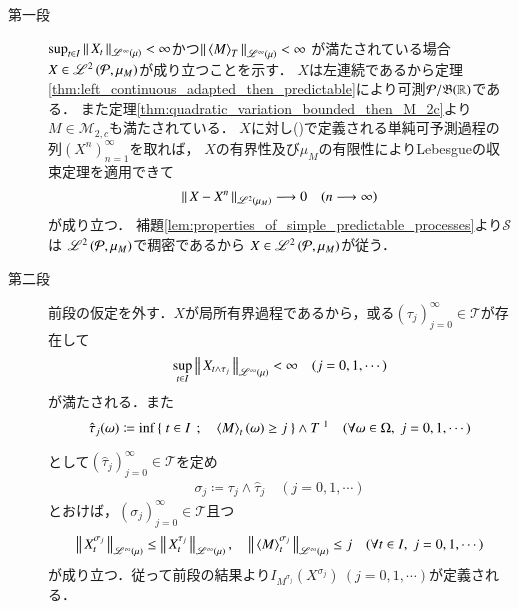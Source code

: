 	\begin{prf}\mbox{}
		\begin{description}
			\item[第一段] $\operatorname*{sup}_{t \in I} \left\|\, X_t\, \right\|_{\mathscr{L}^{\infty} \left(\mu\right)} < \infty$かつ$\Norm{\inprod<M>_T}{\semiLp{\infty}{\mu}} < \infty$
				が満たされている場合$X \in \mathscr{L}^{2} \left(\mathcal{P},\mu_M\right)$が成り立つことを示す．%
				$X$は左連続であるから定理\ref{thm:left_continuous_adapted_then_predictable}により可測$\mathcal{P}/\mathfrak{B}(\mathbb{R})$である．
				また定理\ref{thm:quadratic_variation_bounded_then_M_2c}より$M \in \mathcal{M}_{2,c}$も満たされている．
				$X$に対し()で定義される単純可予測過程の列$(X^n)_{n=1}^{\infty}$を取れば，
				$X$の有界性及び$\mu_M$の有限性によりLebesgueの収束定理を適用できて
				\begin{align}
					\left\|\, X - X^n\, \right\|_{\mathscr{L}^{2} \left(\mu_M\right)} \longrightarrow 0 
					\quad (n \longrightarrow \infty)
				\end{align}
				が成り立つ．
				補題\ref{lem:properties_of_simple_predictable_processes}より$\mathcal{S}$は
				$\mathscr{L}^{2} \left(\mathcal{P},\mu_M\right)$で稠密であるから
				$X \in \mathscr{L}^{2} \left(\mathcal{P},\mu_M\right)$が従う．
				
			\item[第二段]
				前段の仮定を外す．$X$が局所有界過程であるから，或る$(\tau_j)_{j=0}^{\infty} \in \mathcal{T}$が存在して
				\begin{align}
					\operatorname*{sup}_{t \in I} \left\|\, X_{t \wedge \tau_j}\, \right\|_{\mathscr{L}^{\infty} \left(\mu\right)} < \infty
					\quad (j=0,1,\cdots)
				\end{align}
				が満たされる．また
				\begin{align}
					\hat{\tau}_j(\omega) \coloneqq
					\inf{}{\Set{t \in I}{\inprod<M>_t(\omega) \geq j}} \wedge T\ \footnotemark
					\quad (\forall \omega \in \Omega,\ j=0,1,\cdots)
				\end{align}
				として$\left( \hat{\tau}_j \right)_{j=0}^{\infty} \in \mathcal{T}$を定め
				\begin{align}
					\sigma_j \coloneqq \tau_j \wedge \hat{\tau}_j
					\quad (j=0,1,\cdots)
				\end{align}
				とおけば，$(\sigma_j)_{j=0}^{\infty} \in \mathcal{T}$且つ
				\begin{align}
					\Norm{X^{\sigma_j}_t}{\semiLp{\infty}{\mu}} \leq \Norm{X^{\tau_j}_t}{\semiLp{\infty}{\mu}},
					\quad \Norm{\inprod<M>^{\sigma_j}_t}{\semiLp{\infty}{\mu}} \leq j
					\quad (\forall t \in I,\ j=0,1,\cdots)
				\end{align}
				が成り立つ．従って前段の結果より$I_{M^{\sigma_j}}(X^{\sigma_j})\ (j=0,1,\cdots)$が定義される．
				

\end{description}
\end{prf}
